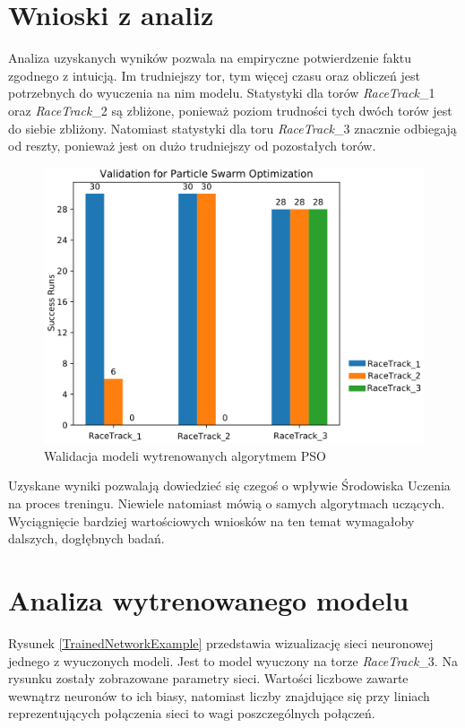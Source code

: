 \section{Wnioski z analiz}
Analiza uzyskanych wyników pozwala na empiryczne potwierdzenie faktu zgodnego z intuicją. Im trudniejszy tor, tym więcej czasu oraz obliczeń jest potrzebnych do wyuczenia na nim modelu. Statystyki dla torów \textit{RaceTrack}\_1 oraz \textit{RaceTrack}\_2 są zbliżone, ponieważ poziom trudności tych dwóch torów jest do siebie zbliżony. Natomiast statystyki dla toru \textit{RaceTrack}\_3 znacznie odbiegają od reszty, ponieważ jest on dużo trudniejszy od pozostałych torów.

\vspace{0.5cm}
\begin{figure}[H]
\centering
\includegraphics[width=15cm]{resources/figures/validation_pso.png}
\caption{Walidacja modeli wytrenowanych algorytmem PSO}
\label{ValidationPSO}
\end{figure}

Uzyskane wyniki pozwalają dowiedzieć się czegoś o wpływie Środowiska Uczenia na proces treningu. Niewiele natomiast mówią o samych algorytmach uczących. Wyciągnięcie bardziej wartościowych wniosków na ten temat wymagałoby dalszych, dogłębnych badań.

\section{Analiza wytrenowanego modelu}
Rysunek \ref{TrainedNetworkExample} przedstawia wizualizację sieci neuronowej jednego z wyuczonych modeli. Jest to model wyuczony na torze \textit{RaceTrack}\_3. Na rysunku zostały zobrazowane parametry sieci. Wartości liczbowe zawarte wewnątrz neuronów to ich biasy, natomiast liczby znajdujące się przy liniach reprezentujących połączenia sieci to wagi poszczególnych połączeń.

